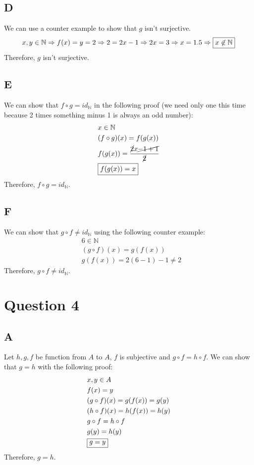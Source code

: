 \documentclass[12pt, oneside]{article}
\begin{document}
\subsection{D}
We can use a counter example to show that $g$ isn't surjective.
\begin{equation*}
x, y \in \mathbb{N} \Rightarrow
f(x) = y = 2 \Rightarrow
2 = 2x - 1 \Rightarrow
2x = 3 \Rightarrow
x = 1.5 \Rightarrow
\framebox{$x \not\in \mathbb{N}$}
\end{equation*}
Therefore, $g$ isn't surjective.

\subsection{E}
We can show that $f \circ g = id_\mathbb{N}$ in the following proof (we need only one this time because 2 times something minus 1 is always an odd number):\\
\begin{eqnarray*}
& x \in \mathbb{N}\\
& (f \circ g)(x) = f(g(x))\\
& f(g(x)) = \dfrac{\cancel{2}x \cancel{- 1 + 1}}{\cancel{2}}\\
& \framebox{$f(g(x)) = x$}
\end{eqnarray*}
Therefore, $f \circ g = id_\mathbb{N}$.

\subsection{F}
We can show that $g \circ f \neq id_\mathbb{N}$ using the following counter example:
\begin{eqnarray*}
& 6 \in \mathbb{N}\\
& (g \circ f)(x) = g(f(x))\\
& g(f(x)) = 2(6 - 1) - 1 \neq 2
\end{eqnarray*}
Therefore, $g \circ f \neq id_\mathbb{N}$.
\clearpage

\section{Question 4}
\subsection{A}
Let $h, g, f$ be function from $A$ to $A$, $f$ is subjective and $g \circ f = h \circ f$.
We can show that $g = h$ with the following proof:
\begin{eqnarray*}
& x, y \in A \\
& f(x) = y \\
& (g \circ f)(x) = g(f(x)) = g(y)\\
& (h \circ f)(x) = h(f(x)) = h(y)\\
& g \circ f = h \circ f\\
& g(y) = h(y)\\
& \framebox{$g = y$}
\end{eqnarray*}
Therefore, $g = h$.
\end{document}
